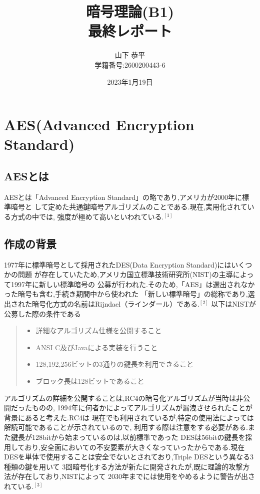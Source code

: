 \documentclass[dvipdfmx,autodetect-engine,titlepage]{jsarticle}
\title{暗号理論(B1)\\最終レポート}
\author{山下 恭平\\学籍番号:2600200443-6}
\date{2023年1月19日}
\begin{document}
\maketitle

\section{AES(Advanced Encryption Standard)}


\subsection{AESとは}

AESとは「Advanced Encryption Standard」の略であり,アメリカが2000年に標準暗号と
して定めた共通鍵暗号アルゴリズムのことである.現在,実用化されている方式の中では,
強度が極めて高いといわれている.\begin{math}^{[1]}\end{math}

\subsection{作成の背景}

1977年に標準暗号として採用されたDES(Data Encryption Standard)にはいくつかの問題
が存在していたため,アメリカ国立標準技術研究所(NIST)の主導によって1997年に新しい標準暗号の
公募が行われた.そのため,「AES」は選出されなかった暗号も含む,手続き期間中から使われた
「新しい標準暗号」の総称であり,選出された暗号化方式の名前はRijndael（ラインダール）である.\begin{math}
  ^{[2]}
\end{math}
以下はNISTが公募した際の条件である

\begin{quote}
  \begin{itemize}
   \item 詳細なアルゴリズム仕様を公開すること
   \item ANSI C及びJavaによる実装を行うこと
   \item 128,192,256ビットの3通りの鍵長を利用できること
   \item ブロック長は128ビットであること
  \end{itemize}
 \end{quote}

 アルゴリズムの詳細を公開することは,RC4の暗号化アルゴリズムが当時は非公開だったものの,
 1994年に何者かによってアルゴリズムが漏洩させられたことが背景にあると考えた.RC4は
 現在でも利用されているが,特定の使用法によっては解読可能であることが示されているので,
 利用する際は注意をする必要がある.また鍵長が128bitから始まっているのは,以前標準であった
 DESは56bitの鍵長を採用しており,安全面においての不安要素が大きくなっていったからである.現在
 DESを単体で使用することは安全でないとされており,Triple DESという異なる3種類の鍵を用いて
 3回暗号化する方法が新たに開発されたが,既に理論的攻撃方法が存在しており,NISTによって
 2030年までには使用をやめるように警告が出されている.\begin{math}^{[3]}\end{math}
\end{document}
